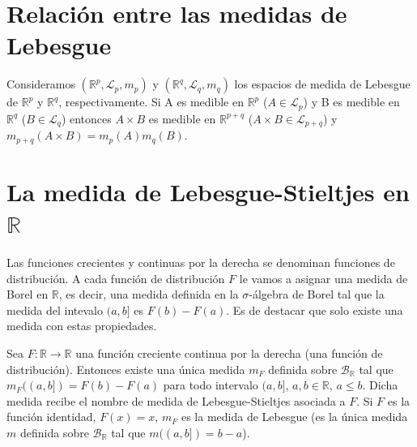 \section{Relación entre las medidas de Lebesgue}

\begin{teo}
Consideramos $(\mathbb{R}^p, \mathcal{L}_p, m_p)$ y $(\mathbb{R}^q, \mathcal{L}_q, m_q)$ los espacios de medida de Lebesgue de $\mathbb{R}^p$ y $\mathbb{R}^q$, respectivamente. Si A es medible en $\mathbb{R}^p$ ($A \in \mathcal{L}_p$) y B es medible en $\mathbb{R}^q$ ($B \in \mathcal{L}_q$) entonces $A \times B$ es medible en $\mathbb{R}^{p + q}$ ($A \times B \in \mathcal{L}_{p + q}$) y $m_{p + q}(A \times B) = m_p(A)m_q(B)$.
\end{teo}

\section{La medida de Lebesgue-Stieltjes en $\mathbb{R}$}

Las funciones crecientes y continuas por la derecha se denominan funciones de distribución. A cada función de distribución $F$ le vamos a asignar una medida de Borel en $\mathbb{R}$, es decir, una medida definida en la $\sigma$-álgebra de Borel tal que la medida del intevalo $(a,b]$ es $F(b) - F(a)$. Es de destacar que solo existe una medida con estas propiedades.

\begin{teo}
Sea $F: \mathbb{R} \longrightarrow \mathbb{R}$ una función creciente continua por la derecha (una función de distribución). Entonces existe una única medida $m_F$ definida sobre $\mathcal{B}_{\mathbb{R}}$ tal que $m_F((a,b]) = F(b) - F(a)$ para todo intervalo $(a,b]$, $a,b \in \mathbb{R}$, $a \leq b$. Dicha medida recibe el nombre de medida de Lebesgue-Stieltjes asociada a $F$. Si $F$ es la función identidad, $F(x) = x$, $m_F$ es la medida de Lebesgue (es la única medida $m$ definida sobre $\mathcal{B}_{\mathbb{R}}$ tal que $m((a,b]) = b - a$).
\end{teo}

